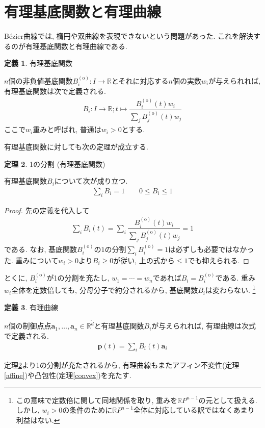 \documentclass{jsarticle}
\newcommand\setR{\mathbb{R}}
\theoremstyle{definition}%
\newtheorem{thm}{定理}
\newtheorem{defn}[thm]{定義}
\begin{document}
\section{有理基底関数と有理曲線}
B\'ezier曲線では, 楕円や双曲線を表現できないという問題があった.
これを解決するのが有理基底関数と有理曲線である.
\begin{screen}
	\begin{defn}
		有理基底関数

		$n$個の非負値基底関数$B_i^{(\text{o})}:I\to \setR$とそれに対応する$n$個の実数$w_i$が与えられれば, 有理基底関数は次で定義される.
		\begin{align}
			B_i:I\to \setR;t\mapsto \dfrac{B_{i}^{(\text{o})}(t)w_i}{\sum\limits_{j}B_{j}^{(\text{o})}(t)w_j}
		\end{align}
		ここで$w_i$重みと呼ばれ, 普通は$w_i>0$とする.
	\end{defn}
\end{screen}
有理基底関数に対しても次の定理が成立する.
\begin{screen}
	\begin{thm}
		\label{Thm201}
		1の分割 (有理基底関数)

        有理基底関数$B_i$について次が成り立つ.
		\begin{align}
			\sum_i B_i= 1 \qquad
            0\le B_i\le 1
		\end{align}
	\end{thm}
\end{screen}
\begin{proof}
	先の定義を代入して
	\begin{align}
		\sum_i B_i(t)=\sum_i \dfrac{B_{i}^{(\text{o})}(t)w_i}{\sum\limits_{j}B_{j}^{(\text{o})}(t)w_j}= 1
	\end{align}
	である.
	なお, 基底関数$B_i^{(\text{o})}$の$1$の分割$\sum\limits_iB_i^{(\text{o})}= 1$は必ずしも必要ではなかった.
    重みについて$w_i>0$より$B_i\ge 0$が従い, 上の式から$\le 1$でも抑えられる.
\end{proof}
とくに, $B_i^{(\text{o})}$が1の分割を充たし, $w_1=\cdots=w_n$であれば$B_i=B_i^{(\text{o})}$である.
重み$w_i$全体を定数倍しても, 分母分子で約分されるから, 基底関数$B_i$は変わらない.%
\footnote{この意味で定数倍に関して同地関係を取り, 重みを$\setR P^{n-1}$の元として扱える. しかし, $w_i>0$の条件のために$\setR P^{n-1}$全体に対応している訳ではなくあまり利益はない.}
\begin{screen}
	\begin{defn}
		有理曲線

        $n$個の制御点点$\bm{a}_1, \dots, \bm{a}_n\in\mathbb{R}^{\tilde{d}}$と有理基底関数$B_i$が与えられれば, 有理曲線は次式で定義される.
		\begin{align}
			\bm{p}(t)=\sum_i B_i(t) \bm{a}_i
		\end{align}
	\end{defn}
\end{screen}
定理\ref{Thm201}より1の分割が充たされるから, 有理曲線もまたアフィン不変性(定理\ref{affine})や凸包性(定理\ref{convex})を充たす.
\end{document}
